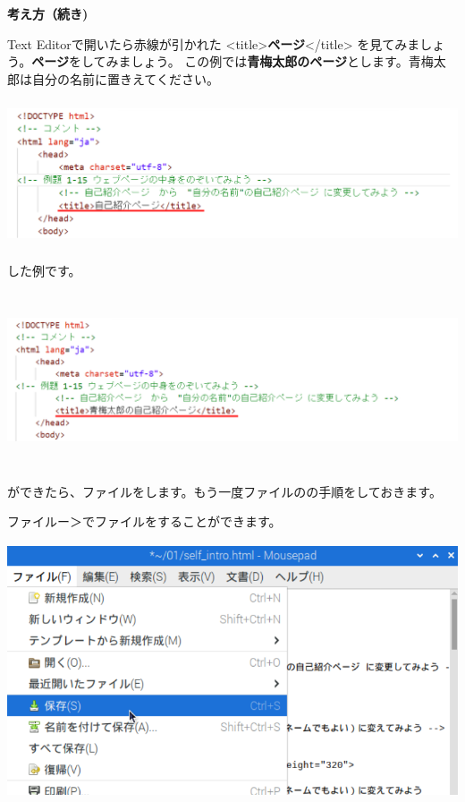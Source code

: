 \documentclass[a4paper,12pt]{jarticle}
\begin{document}
\clearpage
\textbf{考え方（続き)}

Text Editorで開いたら赤線が引かれた
{\textless}title{\textgreater}\textbf{ページ}{\textless}/title{\textgreater}
を見てみましょう。\textbf{ページ}をしてみましょう。
この例では\textbf{青梅太郎のページ}とします。青梅太郎は自分の名前に置きえてください。


\centering
\includegraphics[width=16.316cm,height=4.29cm]{textbook-img146.png}



\bigskip

\flushleft
{}した例です。

\centering
\includegraphics[width=16.198cm,height=5.145cm]{textbook-img148.png}


\bigskip

\flushleft
{}ができたら、ファイルをします。もう一度ファイルのの手順をしておきます。

ファイルー＞でファイルをすることができます。



\centering
\includegraphics[width=13.624cm,height=7.512cm]{textbook-img147.png}
\end{document}
